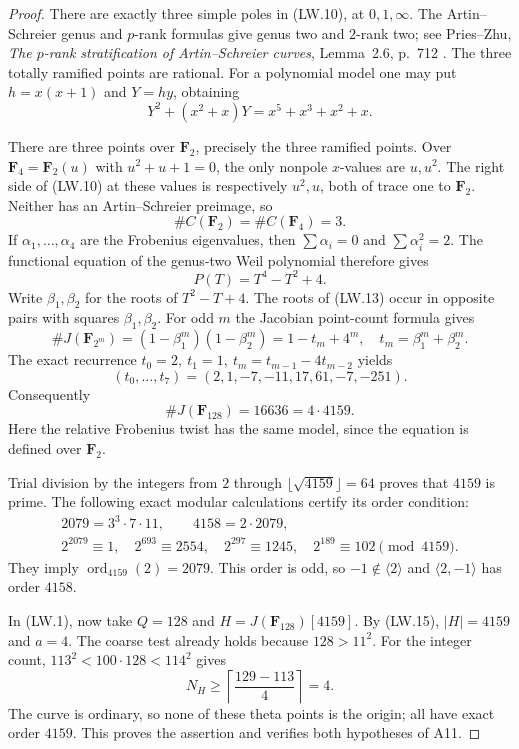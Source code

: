 \begin{proof}
There are exactly three simple poles in (LW.10), at $0,1,\infty$.
The Artin--Schreier genus and $p$-rank formulas give genus two and
$2$-rank two; see Pries--Zhu,
\emph{The $p$-rank stratification of Artin--Schreier curves},
Lemma~2.6, p.~712 \cite{PriesZhu2012}.  The three totally ramified points are rational.
For a polynomial model one may put $h=x(x+1)$ and $Y=hy$, obtaining
\[
               Y^2+(x^2+x)Y=x^5+x^3+x^2+x.
 \tag{LW.11}
\]

There are three points over $\mathbf F_2$, precisely the three
ramified points.  Over
$\mathbf F_4=\mathbf F_2(u)$ with $u^2+u+1=0$, the only nonpole
$x$-values are $u,u^2$.  The right side of (LW.10) at these
values is respectively $u^2,u$, both of trace one to $\mathbf F_2$.
Neither has an Artin--Schreier preimage, so
\[
                      \#C(\mathbf F_2)=\#C(\mathbf F_4)=3.
 \tag{LW.12}
\]
If $\alpha_1,\ldots,\alpha_4$ are the Frobenius eigenvalues, then
$\sum\alpha_i=0$ and $\sum\alpha_i^2=2$.
The functional equation of the genus-two Weil polynomial
therefore gives
\[
                          P(T)=T^4-T^2+4.
 \tag{LW.13}
\]
Write $\beta_1,\beta_2$ for the roots of $T^2-T+4$.
The roots of (LW.13) occur in opposite pairs with squares
$\beta_1,\beta_2$.  For odd $m$ the Jacobian point-count formula
\cite[Theorem~19.1(b)]{MilneAV} gives
\[
 \#J(\mathbf F_{2^m})=(1-\beta_1^m)(1-\beta_2^m)
                   =1-t_m+4^m,
 \quad t_m=\beta_1^m+\beta_2^m.
 \tag{LW.14}
\]
The exact recurrence
$t_0=2,\ t_1=1,\ t_m=t_{m-1}-4t_{m-2}$ yields
\[
                  (t_0,\ldots,t_7)=(2,1,-7,-11,17,61,-7,-251).
\]
Consequently
\[
                    \#J(\mathbf F_{128})=16636=4\cdot4159.
 \tag{LW.15}
\]
Here the relative Frobenius twist has the same model, since the
equation is defined over $\mathbf F_2$.

Trial division by the integers from $2$ through
$\lfloor\sqrt{4159}\rfloor=64$ proves that $4159$ is prime.
The following exact modular calculations certify its order condition:
\[
\begin{gathered}
 2079=3^3\cdot7\cdot11,\qquad 4158=2\cdot2079,\\
 2^{2079}\equiv1,\quad
 2^{693}\equiv2554,\quad
 2^{297}\equiv1245,\quad
 2^{189}\equiv102\pmod{4159}.
\end{gathered}
 \tag{LW.16}
\]
They imply $\operatorname{ord}_{4159}(2)=2079$.
This order is odd, so $-1\notin\langle2\rangle$ and
$\langle2,-1\rangle$ has order $4158$.

In (LW.1), now take $Q=128$ and
$H=J(\mathbf F_{128})[4159]$.  By (LW.15), $|H|=4159$ and $a=4$.
The coarse test already holds because $128>11^2$.
For the integer count,
$113^2<100\cdot128<114^2$ gives
\[
       N_H\ge\left\lceil\frac{129-113}{4}\right\rceil=4.
 \tag{LW.17}
\]
The curve is ordinary, so none of these theta points is the origin;
all have exact order $4159$.  This proves the assertion and
verifies both hypotheses of A11.
\end{proof}

